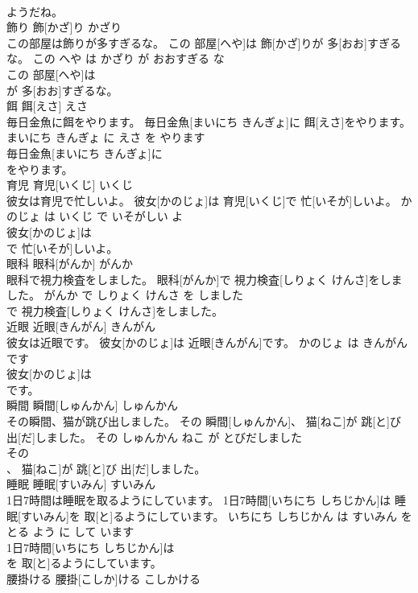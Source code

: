 \documentclass[8pt]{extreport}
\begin{document}
\begin{CJK}{UTF8}{min}
\\	ようだね。			
\\	飾り	飾[かざ]り	かざり	
\\	この部屋は飾りが多すぎるな。	この 部屋[へや]は 飾[かざ]りが 多[おお]すぎるな。	この へや は かざり が おおすぎる な	
\\	この 部屋[へや]は
\\	が 多[おお]すぎるな。			
\\	餌	餌[えさ]	えさ	
\\	毎日金魚に餌をやります。	毎日金魚[まいにち きんぎょ]に 餌[えさ]をやります。	まいにち きんぎょ に えさ を やります	
\\	毎日金魚[まいにち きんぎょ]に
\\	をやります。			
\\	育児	育児[いくじ]	いくじ	
\\	彼女は育児で忙しいよ。	彼女[かのじょ]は 育児[いくじ]で 忙[いそが]しいよ。	かのじょ は いくじ で いそがしい よ	
\\	彼女[かのじょ]は
\\	で 忙[いそが]しいよ。			
\\	眼科	眼科[がんか]	がんか	
\\	眼科で視力検査をしました。	眼科[がんか]で 視力検査[しりょく けんさ]をしました。	がんか で しりょく けんさ を しました	
\\	で 視力検査[しりょく けんさ]をしました。			
\\	近眼	近眼[きんがん]	きんがん	
\\	彼女は近眼です。	彼女[かのじょ]は 近眼[きんがん]です。	かのじょ は きんがん です	
\\	彼女[かのじょ]は
\\	です。			
\\	瞬間	瞬間[しゅんかん]	しゅんかん	
\\	その瞬間、猫が跳び出しました。	その 瞬間[しゅんかん]、 猫[ねこ]が 跳[と]び 出[だ]しました。	その しゅんかん ねこ が とびだしました	
\\	その
\\	、 猫[ねこ]が 跳[と]び 出[だ]しました。			
\\	睡眠	睡眠[すいみん]	すいみん	
\\	1日7時間は睡眠を取るようにしています。	1日7時間[いちにち しちじかん]は 睡眠[すいみん]を 取[と]るようにしています。	いちにち しちじかん は すいみん を とる よう に して います	
\\	1日7時間[いちにち しちじかん]は
\\	を 取[と]るようにしています。			
\\	腰掛ける	腰掛[こしか]ける	こしかける	

\end{CJK}
\end{document}
